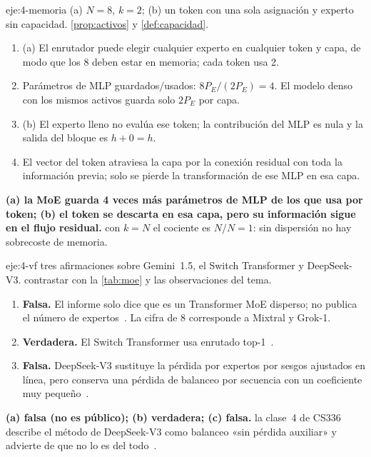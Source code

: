 \begin{solucion}{eje:4-memoria}
\datos (a) $N=8$, $k=2$; (b) un token con una sola asignación y experto sin capacidad.
\planteamiento \cref{prop:activos} y \cref{def:capacidad}.
\pasos
\begin{enumerate}[label=\arabic*.]
  \item (a) El enrutador puede elegir cualquier experto en cualquier token y capa, de modo que los 8 deben estar en memoria; cada token usa 2.
  \item Parámetros de MLP guardados$/$usados: $8P_E/(2P_E)=4$. El modelo denso con los mismos activos guarda solo $2P_E$ por capa.
  \item (b) El experto lleno no evalúa ese token; la contribución del MLP es nula y la salida del bloque es $h+0=h$.
  \item El vector del token atraviesa la capa por la conexión residual con toda la información previa; solo se pierde la transformación de ese MLP en esa capa.
\end{enumerate}
\resultado \textbf{(a) la MoE guarda 4 veces más parámetros de MLP de los que usa por token; (b) el token se descarta en esa capa, pero su información sigue en el flujo residual.}
\comprobacion con $k=N$ el cociente es $N/N=1$: sin dispersión no hay sobrecoste de memoria.
\end{solucion}

\begin{solucion}{eje:4-vf}
\datos tres afirmaciones sobre Gemini~1.5, el Switch Transformer y DeepSeek-V3.
\planteamiento contrastar con la \cref{tab:moe} y las observaciones del tema.
\pasos
\begin{enumerate}[label=(\alph*)]
  \item \textbf{Falsa.} El informe solo dice que es un Transformer MoE disperso; no publica el número de expertos~\cite[§3.1]{gemini15}. La cifra de 8 corresponde a Mixtral y Grok-1.
  \item \textbf{Verdadera.} El Switch Transformer usa enrutado top-1~\cite[§2.1]{switch}.
  \item \textbf{Falsa.} DeepSeek-V3 sustituye la pérdida por expertos por sesgos ajustados en línea, pero conserva una pérdida de balanceo por secuencia con un coeficiente muy pequeño~\cite[§2.1.2]{deepseekv3}.
\end{enumerate}
\resultado \textbf{(a) falsa (no es público); (b) verdadera; (c) falsa.}
\comprobacion la clase~4 de CS336 describe el método de DeepSeek-V3 como balanceo «sin pérdida auxiliar» y advierte de que no lo es del todo~\cite{cs336}.
\end{solucion}

